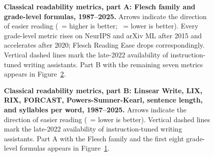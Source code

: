 \begin{figure}[htbp]
\vspace{2mm}

\caption{\textbf{Classical readability metrics, part A: Flesch
  family and grade-level formulas, 1987--2025.}
  Arrows indicate the direction of easier reading
  (\textuparrow\ = higher is better; \textdownarrow\ = lower is
  better). Every grade-level metric rises on NeurIPS and arXiv
  ML after 2015 and accelerates after 2020; Flesch Reading Ease
  drops correspondingly. Vertical dashed lines mark the
  late-2022 availability of instruction-tuned writing
  assistants. Part B with the remaining seven metrics appears in
  Figure~\ref{fig:app-readability-b}.}
\label{fig:app-readability}
\end{figure}

\begin{figure}[htbp]
\centering
{}

\caption{\textbf{Classical readability metrics, part B: Linsear
  Write, LIX, RIX, FORCAST, Powers-Sumner-Kearl, sentence
  length, and syllables per word, 1987--2025.}
  Arrows indicate the direction of easier reading
  (\textdownarrow\ = lower is better). Vertical dashed lines mark
  the late-2022 availability of instruction-tuned writing
  assistants. Part A with the Flesch family and the first eight
  grade-level formulas appears in
  Figure~\ref{fig:app-readability}.}
\label{fig:app-readability-b}
\end{figure}
